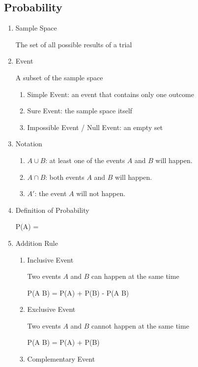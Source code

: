 \documentclass{report}
\begin{document}
\begin{multicols}{2}
  \section{Probability}
  \begin{enumerate}
    \item Sample Space

          The set of all possible results of a trial
    \item Event

          A subset of the sample space
          \begin{enumerate}
            \item Simple Event: an event that contains only one outcome
            \item Sure Event: the sample space itself
            \item Impossible Event / Null Event: an empty set
          \end{enumerate}
    \item Notation
          \begin{enumerate}
            \item $A \cup B$: at least one of the events $A$ and $B$ will happen.

            \item $A \cap B$: both events $A$ and $B$ will happen.

            \item $A'$: the event $A$ will not happen.
          \end{enumerate}
    \item Definition of Probability
          \begin{cequation}
            P(A) = 
          \end{cequation}
    \item Addition Rule
          \begin{enumerate}
            \item Inclusive Event

                  Two events $A$ and $B$ can happen at the same time
                  \begin{cequation}
                    P(A \cup B) = P(A) + P(B) - P(A \cap B)
                  \end{cequation}
            \item Exclusive Event

                  Two events $A$ and $B$ cannot happen at the same time
                  \begin{cequation}
                    P(A \cup B) = P(A) + P(B)
                  \end{cequation}
            \item Complementary Event


\end{enumerate}
\end{enumerate}
\end{multicols}
\end{document}
